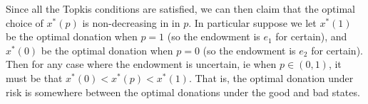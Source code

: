 \documentclass[11pt]{article}
\begin{document}
Since all the Topkis conditions are satisfied, we can then claim that the optimal choice of $x^*(p)$ is non-decreasing in in $p$.    In particular suppose we let $x^*(1)$ be the optimal donation when $p=1$ (so the endowment is $e_1$ for certain), and $x^*(0)$ be the optimal donation when $p=0$ (so the endowment is $e_2$ for certain).  Then for any case where the endowment is uncertain, ie when $p \in (0,1)$, it must be that $x^*(0) < x^*(p) < x^*(1)$. That is, the optimal donation under risk is somewhere between the optimal donations under the good and bad states.
	
\end{document}
